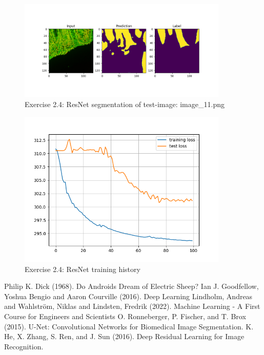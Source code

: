 \documentclass[a4paper,10pt]{article}
\begin{document}
\newpage

\begin{figure}[ht!]
\centering
\includegraphics[width=100mm]{figures/assignment_3/restnet_im11.png}
\caption{Exercise 2.4: ResNet segmentation of test-image: image\_11.png}
\label{fig:resnet11}
\end{figure}


\begin{figure}[ht!]
\centering
\includegraphics[width=100mm]{figures/assignment_3/resnet_history_noskip.png}
\caption{Exercise 2.4: ResNet training history}
\label{fig:resnetnoskip}
\end{figure}

\begin{thebibliography}{1}

 Philip K. Dick (1968). Do Androids Dream of Electric Sheep?
 Ian J. Goodfellow, Yoshua Bengio and Aaron Courville (2016). Deep Learning
 Lindholm, Andreas and Wahlstr\"om, Niklas and Lindsten, Fredrik (2022). Machine Learning - A First Course for Engineers and Scientists
 O. Ronneberger, P. Fischer, and T. Brox (2015). U-Net: Convolutional Networks for Biomedical Image Segmentation.
 K. He, X. Zhang, S. Ren, and J. Sun (2016). Deep Residual Learning for Image Recognition. 





\end{thebibliography}
\end{document}
